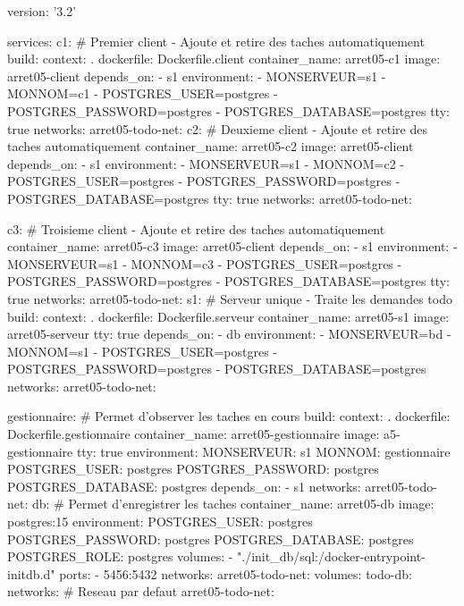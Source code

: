 \begin{code}[title=\texttt{arret05/docker-compose.yaml}, listing options={language=yaml}]
version: '3.2'

services:
  c1: # Premier client - Ajoute et retire des taches automatiquement
    build:
      context: .
      dockerfile: Dockerfile.client
    container_name: arret05-c1
    image: arret05-client
    depends_on:
      - s1
    environment:
      - MONSERVEUR=s1
      - MONNOM=c1
      - POSTGRES_USER=postgres
      - POSTGRES_PASSWORD=postgres
      - POSTGRES_DATABASE=postgres
    tty: true
    networks:
      arret05-todo-net:
  c2: # Deuxieme client - Ajoute et retire des taches automatiquement
    container_name: arret05-c2
    image: arret05-client
    depends_on:
      - s1
    environment:
      - MONSERVEUR=s1
      - MONNOM=c2
      - POSTGRES_USER=postgres
      - POSTGRES_PASSWORD=postgres
      - POSTGRES_DATABASE=postgres
    tty: true
    networks:
      arret05-todo-net:
\end{code}
\begin{code}[title=\texttt{arret05/docker-compose.yaml} (suite), listing options={language=yaml}]
  c3: # Troisieme client - Ajoute et retire des taches automatiquement
    container_name: arret05-c3
    image: arret05-client
    depends_on:
      - s1
    environment:
      - MONSERVEUR=s1
      - MONNOM=c3
      - POSTGRES_USER=postgres
      - POSTGRES_PASSWORD=postgres
      - POSTGRES_DATABASE=postgres
    tty: true
    networks:
      arret05-todo-net:
  s1: # Serveur unique - Traite les demandes todo
    build:
      context: .
      dockerfile: Dockerfile.serveur
    container_name: arret05-s1
    image: arret05-serveur
    tty: true
    depends_on:
      - db
    environment:
      - MONSERVEUR=bd
      - MONNOM=s1
      - POSTGRES_USER=postgres
      - POSTGRES_PASSWORD=postgres
      - POSTGRES_DATABASE=postgres
    networks:
      arret05-todo-net:
\end{code}
\begin{code}[title=\texttt{arret05/docker-compose.yaml} (suite), listing options={language=yaml}]
  gestionnaire: # Permet d'observer les taches en cours
    build:
      context: .
      dockerfile: Dockerfile.gestionnaire
    container_name: arret05-gestionnaire
    image: a5-gestionnaire
    tty: true
    environment:
      MONSERVEUR: s1
      MONNOM: gestionnaire
      POSTGRES_USER: postgres
      POSTGRES_PASSWORD: postgres
      POSTGRES_DATABASE: postgres
    depends_on:
      - s1
    networks:
      arret05-todo-net:
  db: # Permet d'enregistrer les taches
    container_name: arret05-db
    image: postgres:15
    environment:
      POSTGRES_USER: postgres
      POSTGRES_PASSWORD: postgres
      POSTGRES_DATABASE: postgres
      POSTGRES_ROLE: postgres
    volumes:
      - "./init_db/sql:/docker-entrypoint-initdb.d"
    ports:
      - 5456:5432
    networks:
      arret05-todo-net:
volumes:
  todo-db:
networks: # Reseau par defaut
  arret05-todo-net:
\end{code}

